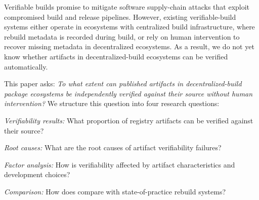 

Verifiable builds promise to mitigate software supply-chain attacks that exploit compromised build and release pipelines.
However, existing verifiable-build systems either operate in ecosystems with centralized build infrastructure, where rebuild metadata is recorded during build, or rely on human intervention to recover missing metadata in decentralized ecosystems.
As a result, we do not yet know whether artifacts in decentralized-build ecosystems can be verified automatically.

This paper asks: \textit{To what extent can published artifacts in decentralized-build package ecosystems be independently verified against their source without human intervention?}
We structure this question into four research questions:

\begin{description}

\item[\textbf{RQ1.}] \textit{Verifiability results:} What proportion of registry artifacts can be verified against their source?

\item[\textbf{RQ2.}] \textit{Root causes:} What are the root causes of artifact verifiability failures?

\item[\textbf{RQ3.}] \textit{Factor analysis:} How is verifiability affected by artifact characteristics and development choices?


\item[\textbf{RQ4.}] \textit{Comparison:} How does \toolname compare with state-of-practice rebuild systems?
\end{description}


